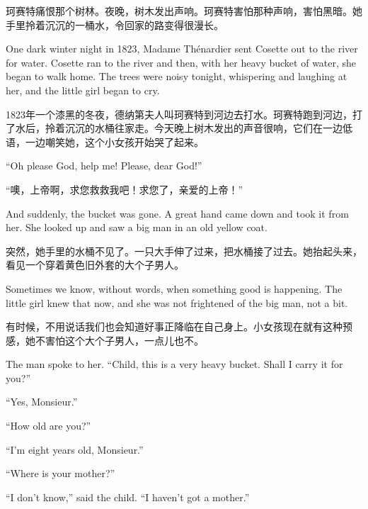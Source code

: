 \documentclass[fontset=ubuntu, zihao=5]{ctexart}
\begin{document}
\begin{paracol}{2}
  \switchcolumn

  珂赛特痛恨那个树林。夜晚，树木发出声响。珂赛特害怕那种声响，害怕黑暗。她手里拎着沉沉的一桶水，令回家的路变得很漫长。

  \switchcolumn*

  One dark winter night in 1823, Madame Thénardier sent Cosette out to the river for water. Cosette ran to the river and then, with her heavy bucket of water, she began to walk home. The trees were noisy tonight, whispering and laughing at her, and the little girl began to cry.

  \switchcolumn

  1823年一个漆黑的冬夜，德纳第夫人叫珂赛特到河边去打水。珂赛特跑到河边，打了水后，拎着沉沉的水桶往家走。今天晚上树木发出的声音很响，它们在一边低语，一边嘲笑她，这个小女孩开始哭了起来。


  \switchcolumn*

  ``Oh please God, help me! Please, dear God!''

  \switchcolumn

  “噢，上帝啊，求您救救我吧！求您了，亲爱的上帝！”

  \switchcolumn*

  And suddenly, the bucket was gone. A great hand came down and took it from her. She looked up and saw a big man in an old yellow coat.

  \switchcolumn

  突然，她手里的水桶不见了。一只大手伸了过来，把水桶接了过去。她抬起头来，看见一个穿着黄色旧外套的大个子男人。

  \switchcolumn*

  Sometimes we know, without words, when something good is happening. The little girl knew that now, and she was not frightened of the big man, not a bit.

  \switchcolumn

  有时候，不用说话我们也会知道好事正降临在自己身上。小女孩现在就有这种预感，她不害怕这个大个子男人，一点儿也不。

  \switchcolumn*

  The man spoke to her. ``Child, this is a very heavy bucket. Shall I carry it for you?''


  ``Yes, Monsieur.''


  ``How old are you?''


  ``I'm eight years old, Monsieur.''


  ``Where is your mother?''


  ``I don't know,'' said the child. ``I haven't got a mother.''



\end{paracol}
\end{document}
